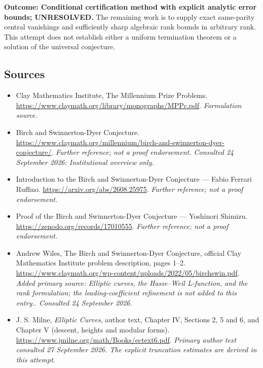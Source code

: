 \documentclass[11pt]{article}
\begin{document}
\textbf{Outcome: Conditional certification method with explicit analytic
error bounds; UNRESOLVED.} The remaining work is to supply exact
same-parity central vanishings and sufficiently sharp algebraic rank
bounds in arbitrary rank. This attempt does not establish either a
uniform termination theorem or a solution of the universal conjecture.

\subsection{Sources}
\begin{itemize}
\item[S1]Clay Mathematics Institute, The Millennium Prize Problems.
\url{https://www.claymath.org/library/monographs/MPPc.pdf}.
\textit{Formulation source.}
\item[S2]Birch and Swinnerton-Dyer Conjecture.
\url{https://www.claymath.org/millennium/birch-and-swinnerton-dyer-conjecture/}.
\textit{Further reference; not a proof endorsement. Consulted 24 September 2026: Institutional overview only.}
\item[S3]Introduction to the Birch and Swinnerton-Dyer Conjecture — Fabio Ferrari Ruffino.
\url{https://arxiv.org/abs/2608.25975}.
\textit{Further reference; not a proof endorsement.}
\item[S4]Proof of the Birch and Swinnerton-Dyer Conjecture — Yoshinori Shimizu.
\url{https://zenodo.org/records/17010555}.
\textit{Further reference; not a proof endorsement.}
\item[E1]Andrew Wiles, The Birch and Swinnerton-Dyer Conjecture, official Clay Mathematics Institute problem description, pages 1–2.
\url{https://www.claymath.org/wp-content/uploads/2022/05/birchswin.pdf}.
\textit{Added primary source: Elliptic curves, the Hasse–Weil L-function, and the rank formulation; the leading-coefficient refinement is not added to this entry.. Consulted 24 September 2026.}
\item[E2]J. S. Milne, \emph{Elliptic Curves}, author text, Chapter IV, Sections 2, 5 and 6, and Chapter V (descent, heights and modular forms).
\url{https://www.jmilne.org/math/Books/ectext6.pdf}.
\textit{Primary author text consulted 27 September 2026. The explicit truncation estimates are derived in this attempt.}
\end{itemize}
\end{document}
